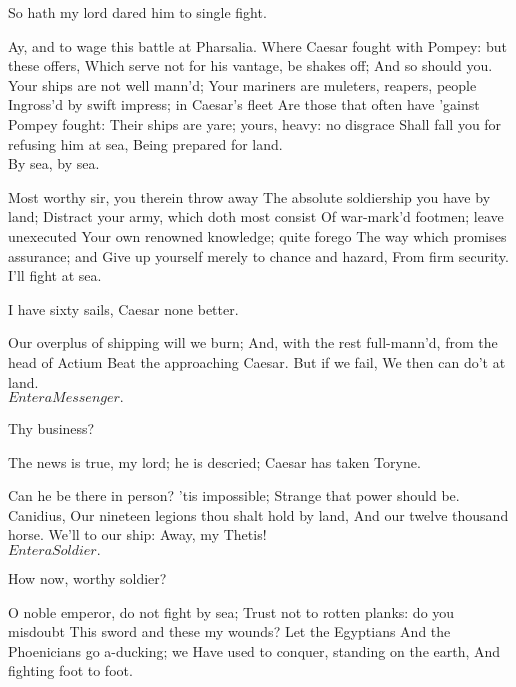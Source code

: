 \documentclass{book}
\begin{document}
	So hath my lord dared him to single fight.

	Ay, and to wage this battle at Pharsalia.
	Where Caesar fought with Pompey: but these offers,
	Which serve not for his vantage, be shakes off;
	And so should you. \\

	                  Your ships are not well mann'd;
	Your mariners are muleters, reapers, people
	Ingross'd by swift impress; in Caesar's fleet
	Are those that often have 'gainst Pompey fought:
	Their ships are yare; yours, heavy: no disgrace
	Shall fall you for refusing him at sea,
	Being prepared for land. \\

\1	By sea, by sea.

	Most worthy sir, you therein throw away
	The absolute soldiership you have by land;
	Distract your army, which doth most consist
	Of war-mark'd footmen; leave unexecuted
	Your own renowned knowledge; quite forego
	The way which promises assurance; and
	Give up yourself merely to chance and hazard,
	From firm security. \\

\1	I'll fight at sea.

\2	I have sixty sails, Caesar none better.

\1	Our overplus of shipping will we burn;
	And, with the rest full-mann'd, from the head of Actium
	Beat the approaching Caesar. But if we fail,
	We then can do't at land. \\


	\(Enter a Messenger.\)

		    Thy business?

	The news is true, my lord; he is descried;
	Caesar has taken Toryne.

\1	Can he be there in person? 'tis impossible;
	Strange that power should be. Canidius,
	Our nineteen legions thou shalt hold by land,
	And our twelve thousand horse. We'll to our ship:
	Away, my Thetis! \\


	\(Enter a Soldier.\)

	How now, worthy soldier?

	O noble emperor, do not fight by sea;
	Trust not to rotten planks: do you misdoubt
	This sword and these my wounds? Let the Egyptians
	And the Phoenicians go a-ducking; we
	Have used to conquer, standing on the earth,
	And fighting foot to foot. \\
\end{document}

